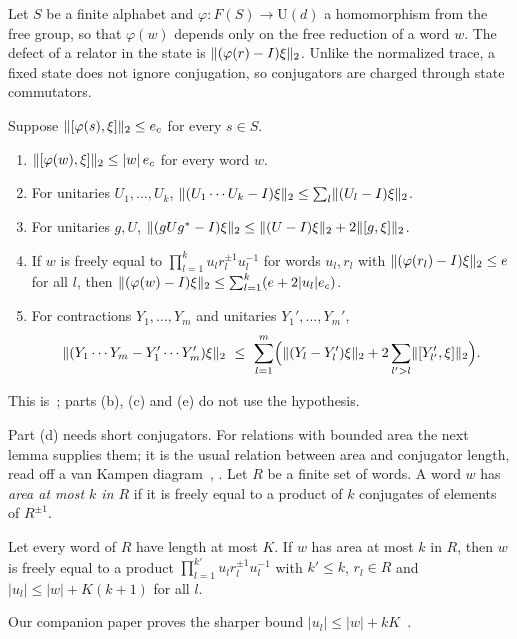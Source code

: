 Let $S$ be a finite alphabet and $\varphi:F(S)\to\mathrm U(d)$ a homomorphism from the free group, so that
$\varphi(w)$ depends only on the free reduction of a word $w$. The defect of a relator in the state is
$\lVert (\varphi(r)-I)\xi\rVert_2$. Unlike the normalized trace, a fixed state does not ignore conjugation, so conjugators are
charged through state commutators.

\begin{lemma}\label{lem:calculus}
Suppose $\lVert [\varphi(s),\xi]\rVert_2\le e_c$ for every $s\in S$.
\begin{enumerate}[label=(\alph*),itemsep=1pt]
\item $\lVert [\varphi(w),\xi]\rVert_2\le|w|\,e_c$ for every word $w$.
\item For unitaries $U_1,\dots,U_k$, $\lVert (U_1\cdots U_k-I)\xi\rVert_2\le\sum_l\lVert (U_l-I)\xi\rVert_2$.
\item For unitaries $g,U$, $\lVert (gUg^*-I)\xi\rVert_2\le\lVert (U-I)\xi\rVert_2+2\lVert [g,\xi]\rVert_2$.
\item If $w$ is freely equal to $\prod_{l=1}^ku_lr_l^{\pm1}u_l^{-1}$ for words $u_l,r_l$ with
$\lVert (\varphi(r_l)-I)\xi\rVert_2\le e$ for all $l$, then $\lVert (\varphi(w)-I)\xi\rVert_2\le\sum_{l=1}^k(e+2|u_l|e_c)$.
\item For contractions $Y_1,\dots,Y_m$ and unitaries $Y_1',\dots,Y_m'$,
\[
\hs{(Y_1\cdots Y_m-Y_1'\cdots Y_m')\xi}\ \le\ \sum_{l=1}^m\Bigl(\hs{(Y_l-Y_l')\xi}+2\sum_{l'>l}\hs{[Y'_{l'},\xi]}\Bigr).
\]
\end{enumerate}
\end{lemma}

This is~\cite[Lemma~3.3]{DM-game}; parts (b), (c) and (e) do not use the hypothesis.

Part (d) needs short conjugators. For relations with bounded area the next lemma supplies them; it is the usual
relation between area and conjugator length, read off a van Kampen diagram~\cite[Chapter~V, Section~1]{LS77}, \cite[Section~4]{Bri02}.
Let $R$ be a finite set of words. A word $w$ has \emph{area at most $k$ in $R$} if it is freely equal to a product of $k$
conjugates of elements of $R^{\pm1}$.

\begin{lemma}\label{lem:conjugators}
Let every word of $R$ have length at most $K$. If $w$ has area at most $k$ in $R$, then $w$ is freely equal to a
product $\prod_{l=1}^{k'}u_lr_l^{\pm1}u_l^{-1}$ with $k'\le k$, $r_l\in R$ and $|u_l|\le|w|+K(k+1)$ for all $l$.
\end{lemma}

Our companion paper proves the sharper bound $|u_l|\le|w|+kK$~\cite[Lemma~3.4]{DM-game}.

